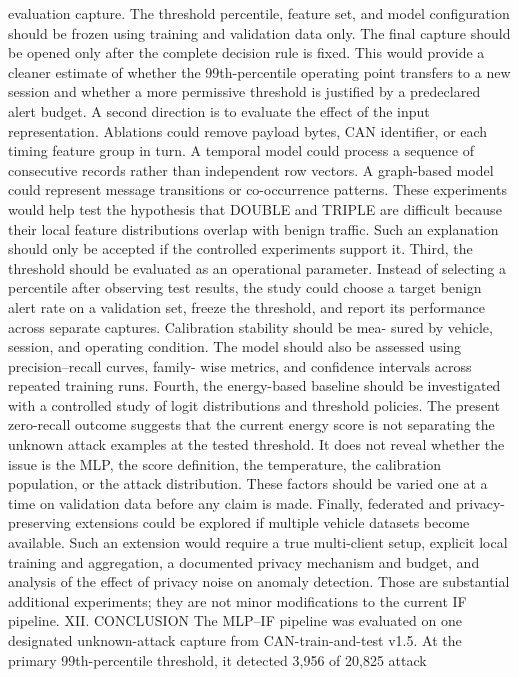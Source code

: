 \documentclass[
]{article}
\begin{document}
evaluation capture. The threshold percentile, feature set, and model
configuration should be frozen using training and validation data only.
The final capture should be opened only after the complete decision rule
is fixed. This would provide a cleaner estimate of whether the
99th-percentile operating point transfers to a new session and whether a
more permissive threshold is justified by a predeclared alert budget. A
second direction is to evaluate the effect of the input representation.
Ablations could remove payload bytes, CAN identifier, or each timing
feature group in turn. A temporal model could process a sequence of
consecutive records rather than independent row vectors. A graph-based
model could represent message transitions or co-occurrence patterns.
These experiments would help test the hypothesis that DOUBLE and TRIPLE
are difficult because their local feature distributions overlap with
benign traffic. Such an explanation should only be accepted if the
controlled experiments support it. Third, the threshold should be
evaluated as an operational parameter. Instead of selecting a percentile
after observing test results, the study could choose a target benign
alert rate on a validation set, freeze the threshold, and report its
performance across separate captures. Calibration stability should be
mea- sured by vehicle, session, and operating condition. The model
should also be assessed using precision--recall curves, family- wise
metrics, and confidence intervals across repeated training runs. Fourth,
the energy-based baseline should be investigated with a controlled study
of logit distributions and threshold policies. The present zero-recall
outcome suggests that the current energy score is not separating the
unknown attack examples at the tested threshold. It does not reveal
whether the issue is the MLP, the score definition, the temperature, the
calibration population, or the attack distribution. These factors should
be varied one at a time on validation data before any claim is made.
Finally, federated and privacy-preserving extensions could be explored
if multiple vehicle datasets become available. Such an extension would
require a true multi-client setup, explicit local training and
aggregation, a documented privacy mechanism and budget, and analysis of
the effect of privacy noise on anomaly detection. Those are substantial
additional experiments; they are not minor modifications to the current
IF pipeline. XII. CONCLUSION The MLP--IF pipeline was evaluated on one
designated unknown-attack capture from CAN-train-and-test v1.5. At the
primary 99th-percentile threshold, it detected 3,956 of 20,825 attack
\end{document}

